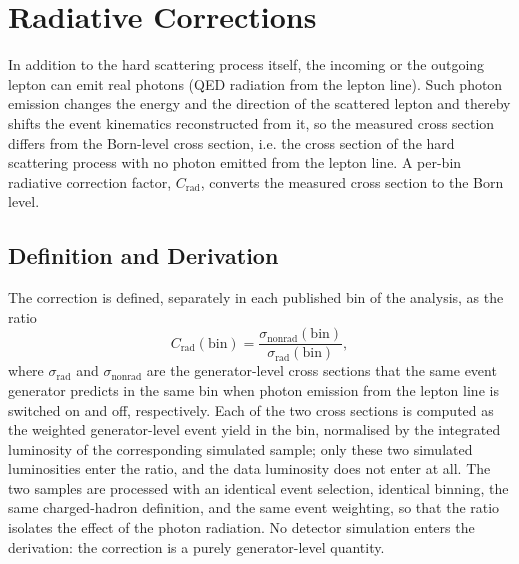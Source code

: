 \section{Radiative Corrections}
\label{sec:radiative_corrections}

In addition to the hard scattering process itself, the incoming or the
outgoing lepton can emit real photons (QED radiation from the lepton
line).  Such photon emission changes the energy and the direction of the
scattered lepton and thereby shifts the event kinematics reconstructed
from it, so the measured cross section differs from the Born-level cross
section, i.e. the cross section of the hard scattering process with no
photon emitted from the lepton line.  A per-bin radiative correction
factor, $C_{\mathrm{rad}}$, converts the measured cross section to the
Born level.

\subsection{Definition and Derivation}
\label{sec:radiative_corrections:definition}

The correction is defined, separately in each published bin of the
analysis, as the ratio
\begin{equation}
  C_{\mathrm{rad}}(\mathrm{bin}) =
  \frac{\sigma_{\mathrm{nonrad}}(\mathrm{bin})}
       {\sigma_{\mathrm{rad}}(\mathrm{bin})},
\end{equation}
where $\sigma_{\mathrm{rad}}$ and $\sigma_{\mathrm{nonrad}}$ are the
generator-level cross sections that the same event generator predicts in
the same bin when photon emission from the lepton line is switched on and
off, respectively.  Each of the two cross sections is computed as the
weighted generator-level event yield in the bin, normalised by the
integrated luminosity of the corresponding simulated sample; only these
two simulated luminosities enter the ratio, and the data luminosity does
not enter at all.  The two samples are processed with an identical event
selection, identical binning, the same charged-hadron definition, and the
same event weighting, so that the ratio isolates the effect of the photon
radiation.  No detector simulation enters the derivation: the correction
is a purely generator-level quantity.

